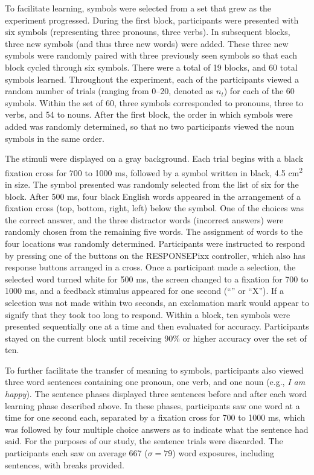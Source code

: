 To facilitate learning, symbols were selected from a set that grew as the 
experiment progressed. During the first block, participants were presented with 
six symbols (representing three pronouns, three verbs). In subsequent blocks, 
three new symbols (and thus three new words) were added. These three new 
symbols were randomly paired with three previously seen symbols so that each 
block cycled through six symbols. There were a total of 19 blocks, and 60 total 
symbols learned. Throughout the experiment, each of the participants viewed a 
random number of trials (ranging from 0--20, denoted as $n_t$) for each of the 
60 symbols. Within the set of 60, three symbols corresponded to pronouns, three 
to verbs, and 54 to nouns. After the first block, the order in which symbols 
were added was randomly determined, so that no two participants viewed the noun 
symbols in the same order.
  
The stimuli were displayed on a gray background.  Each trial begins with a 
black fixation cross for 700 to 1000 ms, followed by a symbol written in black, 
4.5 cm\textsuperscript{2} in size. The symbol presented was randomly selected 
from the list of six for the block. After 500 ms, four black English words 
appeared in the arrangement of a fixation cross (top, bottom, right, left) 
below the symbol. One of the choices was the correct answer, and the three 
distractor words (incorrect answers) were randomly chosen from the remaining 
five words. The assignment of words to the four locations was randomly 
determined. Participants were instructed to respond by pressing one of the 
buttons on the RESPONSEPixx controller, which also has response buttons 
arranged in a cross. Once a participant made a selection, the selected word 
turned white for 500 ms, the screen changed to a fixation for 700 to 1000 ms, 
and a feedback stimulus appeared for one second (``\CheckmarkBold'' or ``X'').  
If a selection was not made within two seconds, an exclamation mark would 
appear to signify that they took too long to respond. Within a block, ten 
symbols were presented sequentially one at a time and then evaluated for 
accuracy. Participants stayed on the current block until receiving 90\% or 
higher accuracy over the set of ten.
  
To further facilitate the transfer of meaning to symbols, participants also 
viewed three word sentences containing one pronoun, one verb, and one noun 
(e.g., \emph{I am happy}). The sentence phases displayed three sentences before 
and after each word learning phase described above. In these phases, 
participants saw one word at a time for one second each, separated by a 
fixation cross for 700 to 1000 ms, which was followed by four multiple choice 
answers as to indicate what the sentence had said. For the purposes of our 
study, the sentence trials were discarded. The participants each saw on average 
667 ($\sigma = 79$) word exposures, including sentences, with breaks provided.
